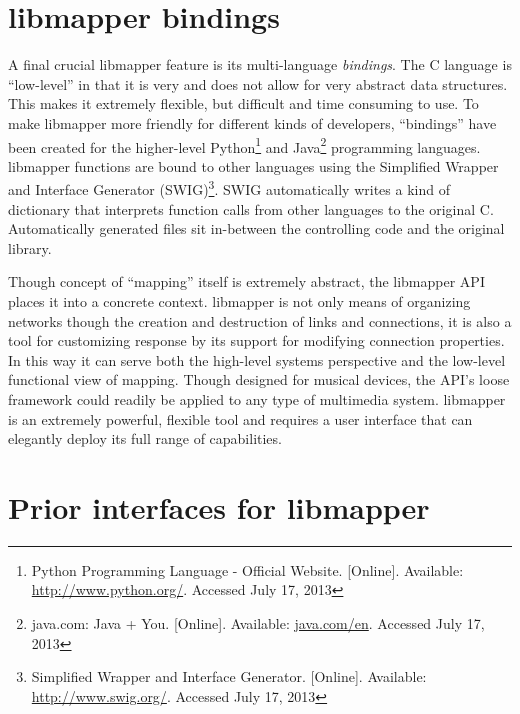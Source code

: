 	\section{libmapper bindings} %
	\label{sec:libmapper_bindings}

A final crucial libmapper feature is its multi-language \emph{bindings}. The C language is ``low-level'' in that it is very and does not allow for very abstract data structures. This makes it extremely flexible, but difficult and time consuming to use. To make libmapper more friendly for different kinds of developers, ``bindings'' have been created for the higher-level 
Python\footnote{Python Programming Language - Official Website. [Online]. Available: \url{http://www.python.org/}. Accessed July 17, 2013} 
and 
Java\footnote{java.com: Java + You. [Online]. Available: \url{java.com/en}. Accessed July 17, 2013} 
programming languages. libmapper functions are bound to other languages using the 
Simplified Wrapper and Interface Generator (SWIG)\footnote{Simplified Wrapper and Interface Generator. [Online]. Available: \url{http://www.swig.org/}. Accessed July 17, 2013}.
SWIG automatically writes a kind of dictionary that interprets function calls from other languages to the original C. Automatically generated files sit in-between the controlling code and the original library. 

Though concept of ``mapping'' itself is extremely abstract, the libmapper API places it into a concrete context. libmapper is not only means of organizing networks though the creation and destruction of links and connections, it is also a tool for customizing response by its support for modifying connection properties. In this way it can serve both the high-level systems perspective and the low-level functional view of mapping. Though designed for musical devices, the API's loose framework could readily be applied to any type of multimedia system. libmapper is an extremely powerful, flexible tool and requires a user interface that can elegantly deploy its full range of capabilities.


\section{Prior interfaces for libmapper} %
\label{sec:prior_interfaces_for_libmapper}


